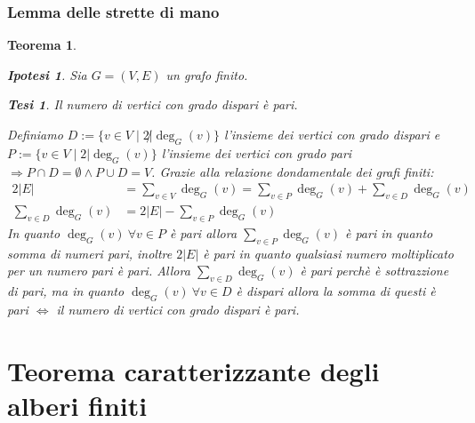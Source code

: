\documentclass{article}
\makeatletter
\renewenvironment{proof}[1][\proofname]{\par
    \pushQED{\qed}%
    \normalfont \topsep6\p@\@plus6\p@\relax
    \trivlist
    \item\relax
    {\itshape
    #1\@addpunct{.}}\hspace\labelsep\ignorespaces
    }{%
    \popQED\endtrivlist\@endpefalse
}
\newtheorem{theorem}{Teorema}[part]
\newtheorem{ipothesis}[lemma]{Ipotesi}
\newtheorem{thesis}[lemma]{Tesi}
\theoremstyle{definition}
\makeatother
\begin{document}
    \section{Lemma delle strette di mano}
        \begin{theorem}
            \begin{ipothesis}
                Sia \(G=(V,E)\) un grafo finito.
            \end{ipothesis}
            \begin{thesis}
                Il numero di vertici con grado dispari è pari.
            \end{thesis}
            \begin{proof}
                Definiamo \(D:=\{v\in V\mid 2\not|\deg_G(v)\}\) l'insieme dei vertici con grado dispari e \(P:=\{v\in V\mid 2|\deg_G(v)\}\) l'insieme dei vertici con grado pari \(\Rightarrow P\cap D=\emptyset\land P\cup D=V\).
                Grazie alla relazione dondamentale dei grafi finiti:
                \[
                    \begin{aligned}
                        2|E|&=\sum_{v\in V}\deg_G(v)=\sum_{v\in P}\deg_G(v)+\sum_{v\in D}\deg_G(v)\\
                        \sum_{v\in D}\deg_G(v)&=2|E|-\sum_{v\in P}\deg_G(v)
                    \end{aligned}
                \]
                In quanto \(\deg_G(v)\ \forall v\in P\) è pari allora \(\sum_{v\in P}\deg_G(v)\) è pari in quanto somma di numeri pari, inoltre \(2|E|\) è pari in quanto qualsiasi numero moltiplicato per un numero pari è pari. Allora \(\sum_{v\in D}\deg_G(v)\) è pari perchè è sottrazzione di pari, ma in quanto \(\deg_G(v)\ \forall v\in D\) è dispari allora la somma di questi è pari \(\Leftrightarrow\) il numero di vertici con grado dispari è pari.
                \pushQED{}
            \end{proof}
            \raggedleft{{\ensuremath{\blacksquare}}}
        \end{theorem}
\part{Teorema caratterizzante degli alberi finiti}
\end{document}
